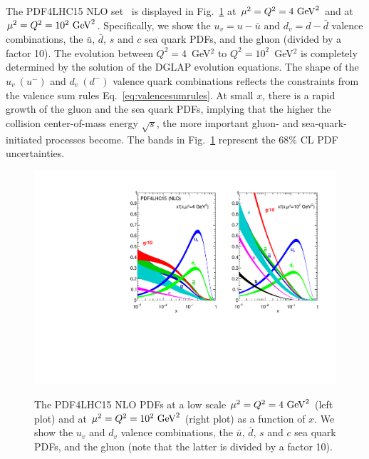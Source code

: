 The PDF4LHC15 NLO set~\cite{Butterworth:2015oua} is displayed in 
Fig.~\ref{fig:nnlopdfs} at $\mu^2=Q^2=4~{\rm GeV}^2$ and at
$\mu^2=Q^2=10^2~{\rm GeV}^2$.
%
Specifically, we show the $u_v=u-\bar{u}$ and $d_v=d-\bar{d}$ valence 
combinations, the $\bar{u}$, $\bar{d}$, $s$ and $c$ sea quark PDFs, 
and the gluon (divided by a factor 10).
%
The evolution between $Q^2=4$~GeV$^2$ to $Q^2=10^2$~GeV$^2$ is completely
determined by the solution of the DGLAP evolution equations.
%
The shape of the $u_v~(u^{-})$ and $d_v~(d^{-})$ valence quark combinations
reflects the constraints from the valence sum rules 
Eq.~\eqref{eq:valencesumrules}.
%
At small $x$, there is a rapid growth of the gluon and the sea quark PDFs, 
implying that the higher the collision center-of-mass energy $\sqrt{s}$, 
the more important gluon- and sea-quark-initiated processes become.
%
The bands in Fig.~\ref{fig:nnlopdfs} represent the 68\% CL PDF uncertainties.

\begin{figure}[!t]
\centering
  \includegraphics[scale=0.8]{plots/PDF4LHC15.pdf}\\
  \caption{\small The PDF4LHC15 NLO PDFs at a low scale
    $\mu^2=Q^2=4~{\rm GeV}^2$ (left plot) and at 
    $\mu^2=Q^2=10^2~{\rm GeV}^2$ (right plot) as a function of $x$.
    We show the $u_v$ and $d_v$ valence combinations, the $\bar{u}$,
    $\bar{d}$, $s$ and $c$ sea quark PDFs, and the gluon (note that
    the latter is divided by a factor 10).
    \label{fig:nnlopdfs}
  }
\end{figure}


